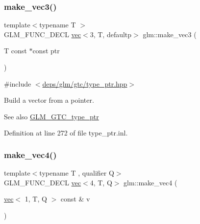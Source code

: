 \subsubsection{\texorpdfstring{make\+\_\+vec3()}{make\_vec3()}\hspace{0.1cm}{\footnotesize\ttfamily [5/5]}}
{\footnotesize\ttfamily template$<$typename T $>$ \\
G\+L\+M\+\_\+\+F\+U\+N\+C\+\_\+\+D\+E\+CL \hyperlink{structglm_1_1vec}{vec}$<$3, T, defaultp$>$ glm\+::make\+\_\+vec3 (\begin{DoxyParamCaption}\item[{T const $\ast$const}]{ptr }\end{DoxyParamCaption})}



{\ttfamily \#include $<$\hyperlink{type__ptr_8hpp}{deps/glm/gtc/type\+\_\+ptr.\+hpp}$>$}

Build a vector from a pointer. \begin{DoxySeeAlso}{See also}
\hyperlink{group__gtc__type__ptr}{G\+L\+M\+\_\+\+G\+T\+C\+\_\+type\+\_\+ptr} 
\end{DoxySeeAlso}


Definition at line 272 of file type\+\_\+ptr.\+inl.

\mbox{\label{group__gtc__type__ptr_ga600cb97f70c5d50d3a4a145e1cafbf37}} 
\subsubsection{\texorpdfstring{make\+\_\+vec4()}{make\_vec4()}\hspace{0.1cm}{\footnotesize\ttfamily [1/5]}}
{\footnotesize\ttfamily template$<$typename T , qualifier Q$>$ \\
G\+L\+M\+\_\+\+F\+U\+N\+C\+\_\+\+D\+E\+CL \hyperlink{structglm_1_1vec}{vec}$<$4, T, Q$>$ glm\+::make\+\_\+vec4 (\begin{DoxyParamCaption}\item[{\hyperlink{structglm_1_1vec}{vec}$<$ 1, T, Q $>$ const \&}]{v }\end{DoxyParamCaption})\hspace{0.3cm}{\ttfamily [inline]}}




